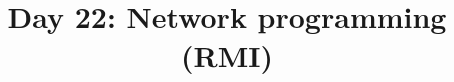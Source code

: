 \documentclass{article}
\begin{document}
\title{Day 22: Network programming (RMI)}
\author{}
\date{}

\maketitle


\end{document}
